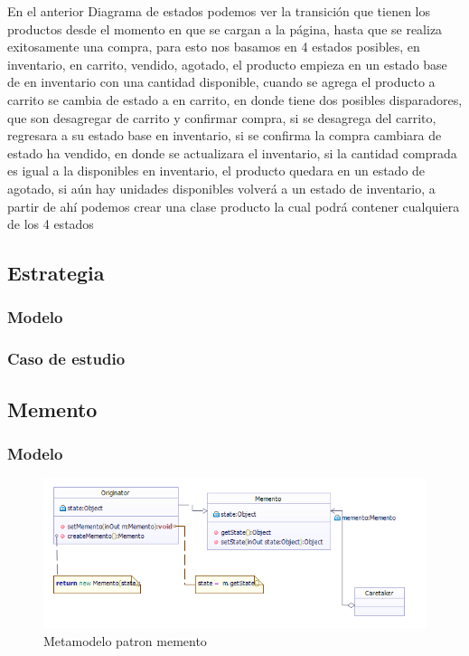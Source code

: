En el anterior Diagrama de estados podemos ver la transición que tienen los productos desde el momento en que se cargan a la página, hasta que se realiza exitosamente una  compra, para esto nos basamos en 4 estados posibles, en inventario, en carrito, vendido, agotado, el producto empieza en un estado base de en inventario con una cantidad disponible, cuando se agrega el producto a carrito se cambia de estado a en carrito, en donde tiene dos posibles disparadores, que son desagregar de carrito y confirmar compra, si se desagrega del carrito, regresara a su estado base en inventario, si se confirma la compra cambiara de estado ha vendido, en donde se actualizara el inventario, si la cantidad comprada es igual a la disponibles en inventario, el producto quedara en un estado de agotado, si aún hay unidades disponibles volverá a un estado de inventario, a partir de ahí podemos crear una clase producto la cual podrá contener cualquiera de los 4 estados
\newpage

\subsection{Estrategia}
\subsubsection{Modelo}
\newpage
\subsubsection{Caso de estudio}
\newpage

\subsection{Memento}
\subsubsection{Modelo}
\begin{figure}[th!]
	\centering
	\includegraphics[width=0.9\linewidth]{arquitectura/imagenes/PatronMemento}
	\caption{Metamodelo patron memento}
	\label{fig:Metamodelo patron memento}
\end{figure}

